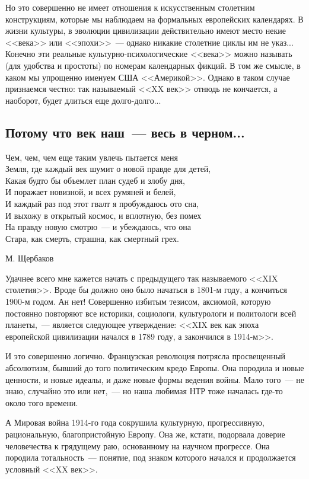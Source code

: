 \documentclass{scrbook}
\makeatletter
\newcommand{\bigepigraphwidth}{0.8} %
\newcommand{\defaultepigraphwidth}{0.5} %
\newcommand{\flqq}{<<}
\newcommand{\frqq}{>>}
\newcommand{\mdash}{~--- }
\newcommand{\commamdash}{~--- } %
\newcommand{\essaysection}[1]{\subsection*{#1}\nopagebreak}
\newcommand{\myepigraph}[3][\@empty]{
	\ifx\@empty#1
		\setlength{\epigraphwidth}{\defaultepigraphwidth\textwidth}
	\else
		\setlength{\epigraphwidth}{#1\textwidth}
	\fi
	\epigraph{#2}{#3}
	\setlength{\epigraphwidth}{\defaultepigraphwidth\textwidth} %
	\nopagebreak
}
\makeatother
\begin{document}
Но это совершенно не имеет отношения к искусственным столетним конструкциям, которые мы наблюдаем на формальных европейских календарях. В жизни культуры, в эволюции цивилизации действительно имеют место некие {\flqq}века{\frqq} или {\flqq}эпохи{\frqq}{\mdash}однако никакие столетние циклы им не указ... Конечно эти реальные культурно-психологические {\flqq}века{\frqq} можно называть (для удобства и простоты) по номерам календарных фикций. В том же смысле, в каком мы упрощенно именуем США {\flqq}Америкой{\frqq}. Однако в таком случае признаемся честно: так называемый {\flqq}XX век{\frqq} отнюдь не кончается, а наоборот, будет длиться еще долго-долго...

\essaysection{Потому что век наш{\mdash}весь в черном...}

\myepigraph[\bigepigraphwidth]{Чем, чем, чем еще таким увлечь пытается меня \\
Земля, где каждый век шумит о новой правде для детей, \\
Какая будто бы объемлет план судеб и злобу дня, \\
И поражает новизной, и всех румяней и белей, \\
И каждый раз под этот гвалт я пробуждаюсь ото сна, \\
И выхожу в открытый космос, и вплотную, без помех \\
На правду новую смотрю{\mdash}и убеждаюсь, что она \\
Стара, как смерть, страшна, как смертный грех.}
{М. Щербаков}

Удачнее всего мне кажется начать с предыдущего так называемого {\flqq}XIX столетия{\frqq}. Вроде бы должно оно было начаться в 1801-м году, а кончиться 1900-м годом. Ан нет! Совершенно избитым тезисом, аксиомой, которую постоянно повторяют все историки, социологи, культурологи и политологи всей планеты,{\commamdash}является следующее утверждение: {\flqq}XIX век как эпоха европейской цивилизации начался в 1789 году, а закончился в 1914-м{\frqq}.
 
И это совершенно логично. Французская революция потрясла просвещенный абсолютизм, бывший до того политическим кредо Европы. Она породила и новые ценности, и новые идеалы, и даже новые формы ведения войны. Мало того{\mdash}не знаю, случайно это или нет,{\commamdash}но наша любимая НТР тоже началась где-то около того времени.

А Мировая война 1914-го года сокрушила культурную, прогрессивную, рациональную, благопристойную Европу. Она же, кстати, подорвала доверие человечества к грядущему раю, основанному на научном прогрессе. Она породила тотальность{\mdash}понятие, под знаком которого начался и продолжается условный {\flqq}XX век{\frqq}.
\end{document}

